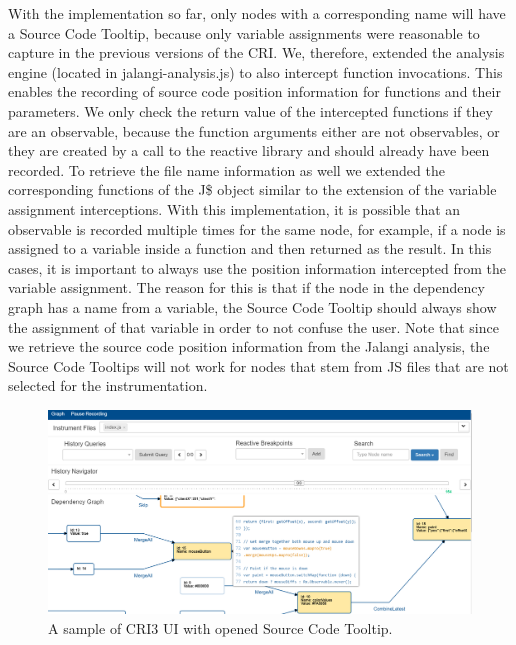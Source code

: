 With the implementation so far, only nodes with a corresponding name will have a Source Code Tooltip, because only variable assignments were reasonable to capture in the previous versions of the CRI. We, therefore, extended the analysis engine (located in jalangi-analysis.js) to also intercept function invocations. This enables the recording of source code position information for functions and their parameters. We only check the return value of the intercepted functions if they are an observable, because the function arguments either are not observables, or they are created by a call to the reactive library and should already have been recorded. To retrieve the file name information as well we extended the corresponding functions of the J\$ object similar to the extension of the variable assignment interceptions. With this implementation, it is possible that an observable is recorded multiple times for the same node, for example, if a node is assigned to a variable inside a function and then returned as the result. In this cases, it is important to always use the position information intercepted from the variable assignment. The reason for this is that if the node in the dependency graph has a name from a variable, the Source Code Tooltip should always show the assignment of that variable in order to not confuse the user. Note that since we retrieve the source code position information from the Jalangi analysis, the Source Code Tooltips will not work for nodes that stem from JS files that are not selected for the instrumentation.\\

\begin{figure}[!h]
	\centering
	\includegraphics[scale=0.5,trim=0 0 0 0]{gfx/CRI-sampleView.png}
	\caption{A sample of CRI3 UI with opened Source Code Tooltip.}
	\label{fig:CRI}
\end{figure}

